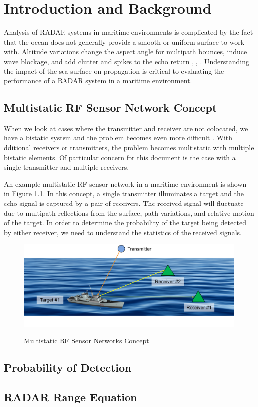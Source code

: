 \renewcommand{\baselinestretch}{2} \small\normalsize
\chapter{Introduction and Background}
Analysis of RADAR systems in maritime environments is complicated by the fact that the ocean does not generally provide a smooth or uniform surface to work with. Altitude variations change the aspect angle for multipath bounces, induce wave blockage, and add clutter and spikes to the echo return \cite{skolnik_handbook}, \cite{blake_radar}, \cite{nathanson_radar}. Understanding the impact of the sea surface on propagation is critical to evaluating the performance of a RADAR system in a maritime environment.

\section{Multistatic RF Sensor Network Concept}
When we look at cases where the transmitter and receiver are not colocated, we have a bistatic system and the problem becomes even more difficult \cite{willis_bistatic}. With dditional receivers or transmitters, the problem becomes multistatic with multiple bistatic elements. Of particular concern for this document is the case with a single transmitter and multiple receivers.

An example multistatic RF sensor network in a maritime environment is shown in Figure \ref{ms_fig:1}. In this concept, a single transmitter illuminates a target and the echo signal is captured by a pair of receivers. The received signal will fluctuate due to multipath reflections from the surface, path variations, and relative motion of the target. In order to determine the probability of the target being detected by either receiver, we need to understand the statistics of the received signals.

\begin{figure}[H]
  \begin{center}
\includegraphics[width=5in]{../media/multistatic/ms_rf_concept.png}
  \end{center}
  \renewcommand{\baselinestretch}{1} \small\normalsize
  \begin{quote}
    \caption[Multistatic RF Sensor Networks Concept]{Multistatic RF Sensor Networks Concept\label{ms_fig:1}}
  \end{quote}
\end{figure}
\renewcommand{\baselinestretch}{2} \small\normalsize

\section{Probability of Detection}

\section{RADAR Range Equation} 